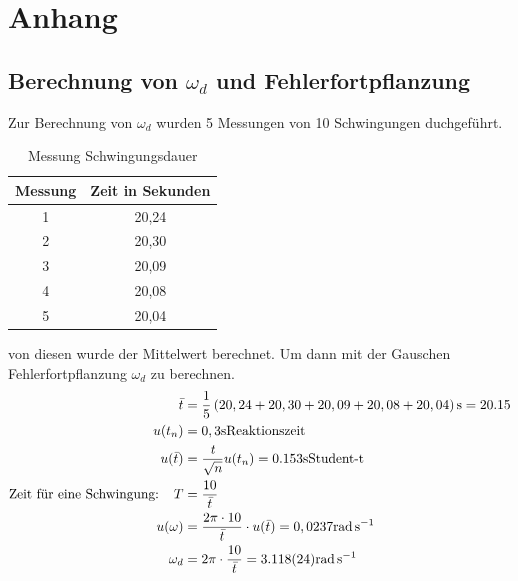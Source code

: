 \documentclass[11pt, a4paper]{article}
\begin{document}
    \section{Anhang}

    \subsection{Berechnung von $\omega_d$ und Fehlerfortpflanzung}
    Zur Berechnung von $\omega_d$ wurden 5 Messungen von 10 Schwingungen duchgeführt.
    \begin{table}
        \centering
        \begin{tabular}{c c}
            Messung & Zeit in Sekunden \\ \hline
            1 & 20,24 \\
            2 & 20,30 \\
            3 & 20,09 \\
            4 & 20,08 \\
            5 & 20,04
        \end{tabular}
        \caption{Messung Schwingungsdauer}
        \label{Tab:messen}
    \end{table}
    von diesen wurde der Mittelwert berechnet. Um dann mit der Gauschen Fehlerfortpflanzung \cite[(19)]{ABW} $\omega_d$ zu berechnen.
    \begin{align}
        \bar{t} &= \frac{1}{5} \left(20,24 + 20,30 + 20,09 + 20,08 + 20,04 \right) \si{\second} = 20.15 \\
        u(t_n) &= 0,3 \si{\second} \text{Reaktionszeit} \\
        u(\bar{t}) &= \frac{{\it t}}{\sqrt{n}} u(t_n) = 0.153 \si{\second} \text{Student-t} \\
        \text{Zeit für eine Schwingung: } \ \ T &= \frac{10}{\bar{t}} \\
        u(\omega) &= \frac{2 \pi \cdot 10}{\bar{t}} \cdot u(\bar{t}) = 0,0237 \si{\radian\per\second} \\
        \omega_d &= 2 \pi \cdot \frac{10}{\bar{t}} = 3.118(24) \si{\radian\per\second}
    \end{align}


    
    
\end{document}
